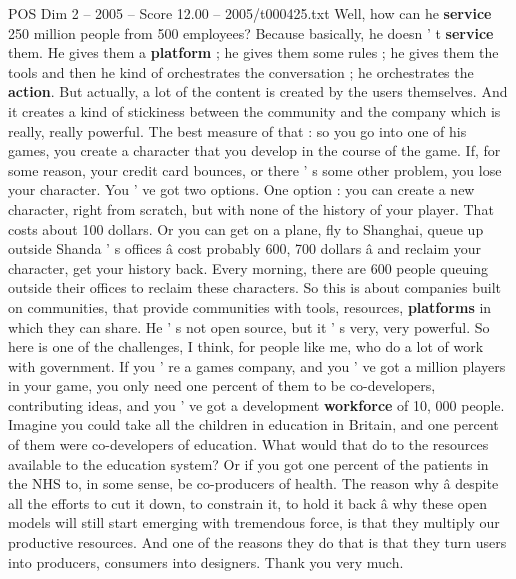\begin{textsample}{POS Dim 2 – 2005 – Score 12.00 – 2005/t000425.txt}
Well, how can he \textbf{service} 250 million people from 500 employees?
Because basically, he doesn ' t \textbf{service} them.
He gives them a \textbf{platform} ; he gives them some rules ; he gives them the tools and then he kind of orchestrates the conversation ; he orchestrates the \textbf{action}.
But actually, a lot of the content is created by the users themselves.
And it creates a kind of stickiness between the community and the company which is really, really powerful.
The best measure of that : so you go into one of his games, you create a character that you develop in the course of the game.
If, for some reason, your credit card bounces, or there ' s some other problem, you lose your character.
You ' ve got two options.
One option : you can create a new character, right from scratch, but with none of the history of your player.
That costs about 100 dollars.
Or you can get on a plane, fly to Shanghai, queue up outside Shanda ' s offices â cost probably 600, 700 dollars â and reclaim your character, get your history back.
Every morning, there are 600 people queuing outside their offices to reclaim these characters.
So this is about companies built on communities, that provide communities with tools, resources, \textbf{platforms} in which they can share.
He ' s not open source, but it ' s very, very powerful.
So here is one of the challenges, I think, for people like me, who do a lot of work with government.
If you ' re a games company, and you ' ve got a million players in your game, you only need one percent of them to be co-developers, contributing ideas, and you ' ve got a development \textbf{workforce} of 10, 000 people.
Imagine you could take all the children in education in Britain, and one percent of them were co-developers of education.
What would that do to the resources available to the education system?
Or if you got one percent of the patients in the NHS to, in some sense, be co-producers of health.
The reason why â despite all the efforts to cut it down, to constrain it, to hold it back â why these open models will still start emerging with tremendous force, is that they multiply our productive resources.
And one of the reasons they do that is that they turn users into producers, consumers into designers.
Thank you very much.

\end{textsample}
